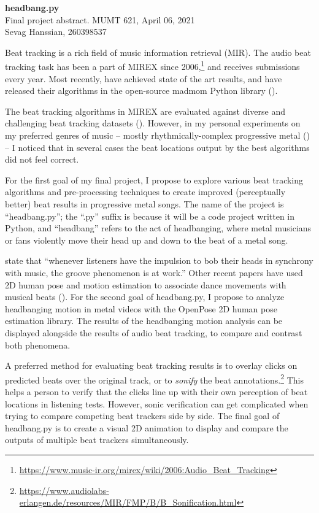 \documentclass[letter,12pt]{report}
\begin{document}
\noindent\Large{\textbf{headbang.py}}\\
\large{Final project abstract. MUMT 621, April 06, 2021}\\
\large{Sevag Hanssian, 260398537}

\noindent\hrulefill

\vspace{2em}

Beat tracking is a rich field of music information retrieval (MIR). The audio beat tracking task has been a part of MIREX since 2006,\footnote{\url{https://www.music-ir.org/mirex/wiki/2006:Audio_Beat_Tracking}} and receives submissions every year. Most recently, \textcite{bock1, bock2} have achieved state of the art results, and have released their algorithms in the open-source madmom Python library (\cite{madmom}).

The beat tracking algorithms in MIREX are evaluated against diverse and challenging beat tracking datasets (\cite{beatmeta}). However, in my personal experiments on my preferred genres of music -- mostly rhythmically-complex progressive metal (\cite{meshuggah, periphery}) -- I noticed that in several cases the beat locations output by the best algorithms did not feel correct.

For the first goal of my final project, I propose to explore various beat tracking algorithms and pre-processing techniques to create improved (perceptually better) beat results in progressive metal songs. The name of the project is ``headbang.py''; the ``.py'' suffix is because it will be a code project written in Python, and ``headbang'' refers to the act of headbanging, where metal musicians or fans violently move their head up and down to the beat of a metal song.

\textcite{groove} state that ``whenever listeners have the impulsion to bob their heads in synchrony with music, the groove phenomenon is at work.'' Other recent papers have used 2D human pose and motion estimation to associate dance movements with musical beats (\cite{pose1, pose2}). For the second goal of headbang.py, I propose to analyze headbanging motion in metal videos with the OpenPose 2D human pose estimation library. The results of the headbanging motion analysis can be displayed alongside the results of audio beat tracking, to compare and contrast both phenomena.

A preferred method for evaluating beat tracking results is to overlay clicks on predicted beats over the original track, or to \textit{sonify} the beat annotations.\footnote{\url{https://www.audiolabs-erlangen.de/resources/MIR/FMP/B/B_Sonification.html}} This helps a person to verify that the clicks line up with their own perception of beat locations in listening tests. However, sonic verification can get complicated when trying to compare competing beat trackers side by side. The final goal of headbang.py is to create a visual 2D animation to display and compare the outputs of multiple beat trackers simultaneously.

\vfill
\clearpage

\nocite{*}
\printbibheading[title={\vspace{-3.5em}References},heading=bibnumbered]
\vspace{-1.5em}
\printbibliography[heading=none]
\end{document}
